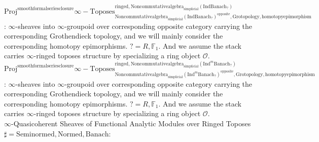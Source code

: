 \documentclass[11pt]{book}
\theoremstyle{definition}
\numberwithin{equation}{section}
\begin{document}
\noindent $\mathrm{Proj}^\text{smoothformalseriesclosure}\infty-\mathrm{Toposes}^{\mathrm{ringed},\mathrm{Noncommutativealgebra}_{\mathrm{simplicial}}(\mathrm{Ind}\mathrm{Banach}_?)}_{\mathrm{Noncommutativealgebra}_{\mathrm{simplicial}}(\mathrm{Ind}\mathrm{Banach}_?)^\mathrm{opposite},\mathrm{Grotopology,homotopyepimorphism}}$: $\infty$-sheaves into $\infty$-groupoid over corresponding opposite category carrying the corresponding Grothendieck topology, and we will mainly consider the corresponding homotopy epimorphisms. $?=R,\mathbb{F}_1$. And we assume the stack carries $\infty$-ringed toposes structure by specializing a ring object $\mathcal{O}$.\\
\noindent $\mathrm{Proj}^\text{smoothformalseriesclosure}\infty-\mathrm{Toposes}^{\mathrm{ringed},\mathrm{Noncommutativealgebra}_{\mathrm{simplicial}}(\mathrm{Ind}^m\mathrm{Banach}_?)}_{\mathrm{Noncommutativealgebra}_{\mathrm{simplicial}}(\mathrm{Ind}^m\mathrm{Banach}_?)^\mathrm{opposite},\mathrm{Grotopology,homotopyepimorphism}}$: $\infty$-sheaves into $\infty$-groupoid over corresponding opposite category carrying the corresponding Grothendieck topology, and we will mainly consider the corresponding homotopy epimorphisms. $?=R,\mathbb{F}_1$. And we assume the stack carries $\infty$-ringed toposes structure by specializing a ring object $\mathcal{O}$.\\ 



\noindent $\infty$-Quasicoherent Sheaves of Functional Analytic Modules over Ringed Toposes $\sharp=\mathrm{Seminormed},\mathrm{Normed},\mathrm{Banach}$: \\
 
\end{document}
